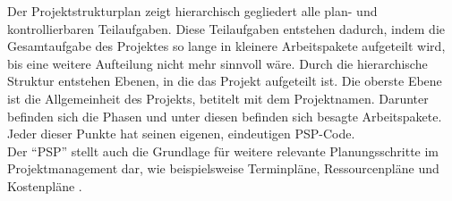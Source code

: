 Der Projektstrukturplan zeigt hierarchisch gegliedert alle plan- und kontrollierbaren Teilaufgaben. Diese Teilaufgaben entstehen dadurch, indem die Gesamtaufgabe des Projektes so lange in kleinere Arbeitspakete aufgeteilt wird, bis eine weitere Aufteilung nicht mehr sinnvoll wäre. Durch die hierarchische Struktur entstehen Ebenen, in die das Projekt aufgeteilt ist. Die oberste Ebene ist die Allgemeinheit des Projekts, betitelt mit dem Projektnamen. Darunter befinden sich die Phasen und unter diesen befinden sich besagte Arbeitspakete. Jeder dieser Punkte hat seinen eigenen, eindeutigen PSP-Code.
\\Der \enquote{PSP} stellt auch die Grundlage für weitere relevante Planungsschritte im Projektmanagement dar, wie beispielsweise Terminpläne, Ressourcenpläne und Kostenpläne \cite{Kindl_Niels:2023}.